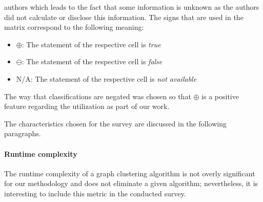 \documentclass[12pt,a4paper]{report}
\begin{document}
\begin{table}[ht!]
{  authors which leads to the fact that some information is unknown as
  the authors did not calculate or disclose this information.
  The signs that are used in the matrix correspond to the following meaning:
  \begin{itemize}[noitemsep]
    \item $\oplus$: The statement of the respective cell is \textit{true}
    \item $\ominus$: The statement of the respective cell is \textit{false}
    \item N/A: The statement of the respective cell is \textit{not available}
  \end{itemize}
  The way that classifications are negated was chosen so that $\oplus$
  is a positive feature regarding the utilization as part of our work.
}
\label{table:graph-clustering-survey}
\end{table}

The characteristics chosen for the survey are discussed in the following paragraphs.

\paragraph{Runtime complexity}
The runtime complexity of a graph clustering
algorithm is not overly significant for our methodology and does not eliminate
a given algorithm; nevertheless, it is interesting to include this metric in
the conducted survey.
\end{document}

